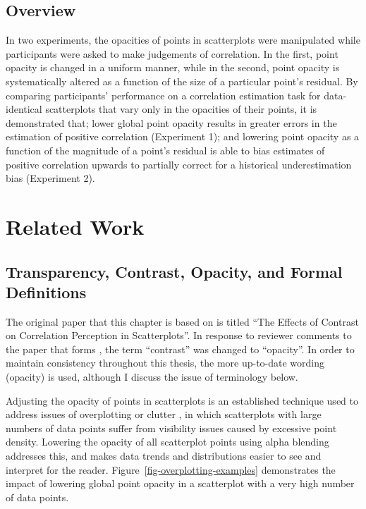 \documentclass[../main.tex]{subfiles}
\begin{document}
\subsection{Overview}\label{overview-adjusting-opacity}

In two experiments, the opacities of points in scatterplots were
manipulated while participants were asked to make judgements of
correlation. In the first, point opacity is changed in a uniform manner,
while in the second, point opacity is systematically altered as a
function of the size of a particular point's residual. By comparing
participants' performance on a correlation estimation task for
data-identical scatterplots that vary only in the opacities of their
points, it is demonstrated that; lower global point opacity results in
greater errors in the estimation of positive correlation (Experiment 1);
and lowering point opacity as a function of the magnitude of a point's
residual is able to bias estimates of positive correlation upwards to
partially correct for a historical underestimation bias (Experiment 2).

\section{Related Work}\label{related-work-adjusting-opacity}

\subsection{Transparency, Contrast, Opacity, and Formal
Definitions}\label{transparency-contrast-opacity-and-formal-definitions}

The original paper that this chapter is based on is titled ``The Effects
of Contrast on Correlation Perception in Scatterplots''. In response to
reviewer comments to the paper that forms
, the term ``contrast'' was changed
to ``opacity''. In order to maintain consistency throughout this thesis,
the more up-to-date wording (opacity) is used, although I discuss the
issue of terminology below.

Adjusting the opacity of points in scatterplots is an established
technique used to address issues of overplotting or clutter
\cite{bertini_2004, matejka_2015}, in which scatterplots with large
numbers of data points suffer from visibility issues caused by excessive
point density. Lowering the opacity of all scatterplot points using
alpha blending \cite{few_2008} addresses this, and makes data trends and
distributions easier to see and interpret for the reader.
Figure~\ref{fig-overplotting-examples} demonstrates the impact of
lowering global point opacity in a scatterplot with a very high number
of data points.
\end{document}
